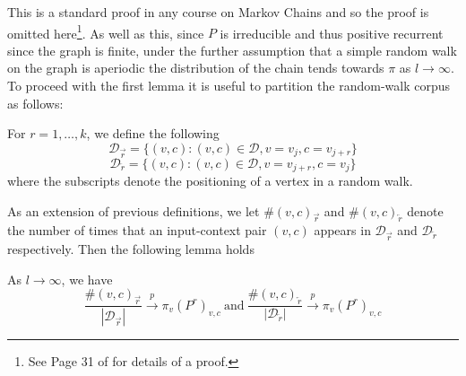 \documentclass[a4paper]{article}
\newcommand{\D}{\mathcal D}
\newcommand{\rar}{\overrightarrow r}
\newcommand{\lar}{\overleftarrow r}
\begin{document}
This is a standard proof in any course on Markov Chains and so the proof is
omitted here\footnote{See Page 31 of \cite{markov_chains} for details of a proof.}. As
well as this, since $P$ is irreducible and thus positive recurrent since the
graph is finite, under the further assumption that a simple random walk on the
graph is aperiodic the distribution of the chain tends towards $\pi$ as
$l \to \infty$.\\
To proceed with the first lemma it is useful to partition the random-walk corpus as follows:
\begin{definition}
  For $r = 1, \dots, k$, we define the following
  \[\D_{\rar} = \{ (v, c) : (v, c) \in \D, v = v_j, c = v_{j+r}\}\]
  \[\D_{\lar} = \{ (v, c) : (v, c) \in \D, v = v_{j+r}, c = v_{j}\}\]
  where the subscripts denote the positioning of a vertex in a random walk.
\end{definition}
As an extension of previous definitions, we let $\#(v, c)_{\rar}$ and $\#(v,
c)_{\lar}$ denote the number of times that an input-context pair $(v,c)$ appears
in $\D_{\rar}$ and $\D_{\lar}$ respectively. Then the following lemma holds
\begin{lemma}
  As $l \to \infty$, we have
  \[\frac{\#(v, c)_{\rar}}{|\D_{\rar}|} \overset{p}{\longrightarrow} \pi_v(P^r)_{v,c} \  \text{and}
    \ \frac{\#(v, c)_{\lar}}{|\D_{\lar}|} \overset{p}{\longrightarrow} \pi_v(P^r)_{v,c} \]
\end{lemma}
\end{document}

